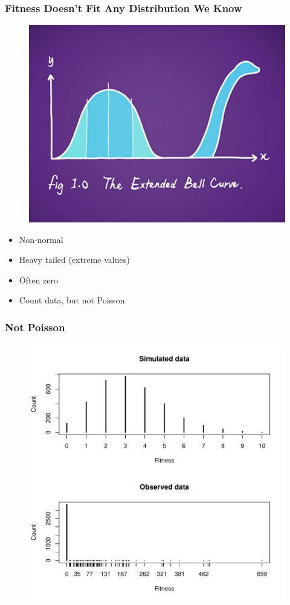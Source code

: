 \documentclass[table]{beamer}
\begin{document}
\begin{frame}
  \frametitle{Fitness Doesn't Fit Any Distribution We Know}
  \begin{figure}
  \includegraphics[width=0.5\linewidth]{ebc.png}
  \end{figure}
  \begin{itemize}
    \item Non-normal
    \item Heavy tailed (extreme values)
    \item Often zero
    \item Count data, but not Poisson
  \end{itemize}
\end{frame}

\begin{frame}
  \frametitle{Not Poisson}
  \begin{figure}
  \includegraphics[width=0.65\linewidth]{Not_Poisson.pdf}
  \end{figure}
\end{frame}
\end{document}
